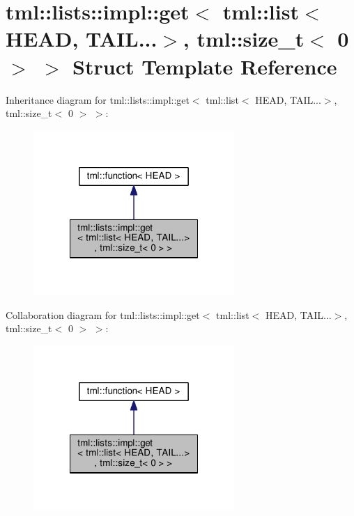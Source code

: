 \hypertarget{structtml_1_1lists_1_1impl_1_1get_3_01tml_1_1list_3_01_h_e_a_d_00_01_t_a_i_l_8_8_8_4_00_01tml_1_1size__t_3_010_01_4_01_4}{\section{tml\+:\+:lists\+:\+:impl\+:\+:get$<$ tml\+:\+:list$<$ H\+E\+A\+D, T\+A\+I\+L...$>$, tml\+:\+:size\+\_\+t$<$ 0 $>$ $>$ Struct Template Reference}
\label{structtml_1_1lists_1_1impl_1_1get_3_01tml_1_1list_3_01_h_e_a_d_00_01_t_a_i_l_8_8_8_4_00_01tml_1_1size__t_3_010_01_4_01_4}
}


Inheritance diagram for tml\+:\+:lists\+:\+:impl\+:\+:get$<$ tml\+:\+:list$<$ H\+E\+A\+D, T\+A\+I\+L...$>$, tml\+:\+:size\+\_\+t$<$ 0 $>$ $>$\+:
\nopagebreak
\begin{figure}[H]
\begin{center}
\leavevmode
\includegraphics[width=216pt]{structtml_1_1lists_1_1impl_1_1get_3_01tml_1_1list_3_01_h_e_a_d_00_01_t_a_i_l_8_8_8_4_00_01tml_1_e77480dd4defc8340e79411ae33b55e9}
\end{center}
\end{figure}


Collaboration diagram for tml\+:\+:lists\+:\+:impl\+:\+:get$<$ tml\+:\+:list$<$ H\+E\+A\+D, T\+A\+I\+L...$>$, tml\+:\+:size\+\_\+t$<$ 0 $>$ $>$\+:
\nopagebreak
\begin{figure}[H]
\begin{center}
\leavevmode
\includegraphics[width=216pt]{structtml_1_1lists_1_1impl_1_1get_3_01tml_1_1list_3_01_h_e_a_d_00_01_t_a_i_l_8_8_8_4_00_01tml_1_55063b74f7c73a4cd47830e539e71174}
\end{center}
\end{figure}
